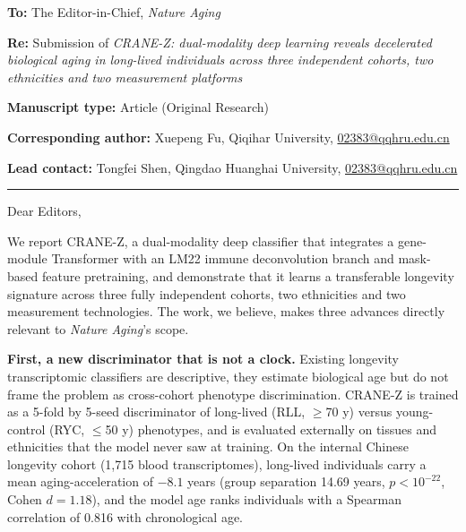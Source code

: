
\textbf{To:} The Editor-in-Chief, \textit{Nature Aging}

\medskip

\noindent\textbf{Re:} Submission of \textit{CRANE-Z: dual-modality deep learning reveals decelerated biological aging in long-lived individuals across three independent cohorts, two ethnicities and two measurement platforms}

\medskip

\noindent\textbf{Manuscript type:} Article (Original Research)

\medskip

\noindent\textbf{Corresponding author:} Xuepeng Fu, Qiqihar University, \href{mailto:02383@qqhru.edu.cn}{02383@qqhru.edu.cn}

\medskip

\noindent\textbf{Lead contact:} Tongfei Shen, Qingdao Huanghai University, \href{mailto:02383@qqhru.edu.cn}{02383@qqhru.edu.cn}

\medskip

\hrule

\medskip

Dear Editors,

We report CRANE-Z, a dual-modality deep classifier that integrates a gene-module Transformer with an LM22 immune deconvolution branch and mask-based feature pretraining, and demonstrate that it learns a transferable longevity signature across three fully independent cohorts, two ethnicities and two measurement technologies. The work, we believe, makes three advances directly relevant to \textit{Nature Aging}'s scope.

\textbf{First, a new discriminator that is not a clock.} Existing longevity transcriptomic classifiers are descriptive, they estimate biological age but do not frame the problem as cross-cohort phenotype discrimination. CRANE-Z is trained as a 5-fold by 5-seed discriminator of long-lived (RLL, $\geq$70 y) versus young-control (RYC, $\leq$50 y) phenotypes, and is evaluated externally on tissues and ethnicities that the model never saw at training. On the internal Chinese longevity cohort (1,715 blood transcriptomes), long-lived individuals carry a mean aging-acceleration of $-8.1$ years (group separation 14.69 years, $p<10^{-22}$, Cohen $d=1.18$), and the model age ranks individuals with a Spearman correlation of 0.816 with chronological age.

